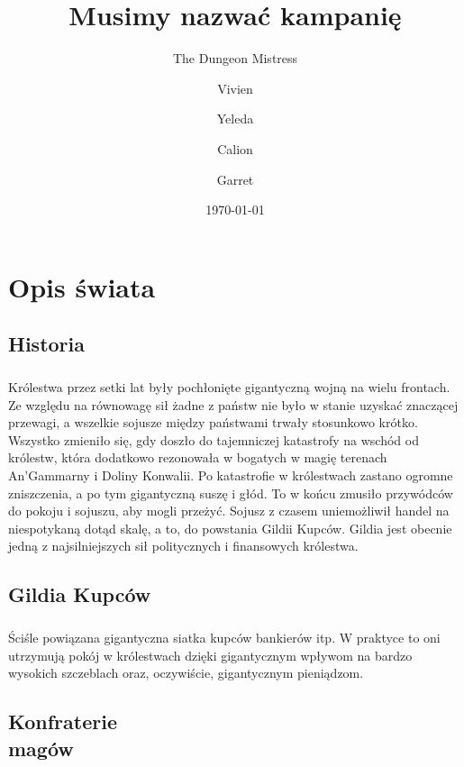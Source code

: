 \documentclass[10pt,twoside,twocolumn]{book}
\title{Musimy nazwać kampanię}
\date{\today}
\author{The Dungeon Mistress}
\author{Vivien}
\author{Yeleda}
\author{Calion}
\author{Garret}
\begin{document}
\selectfont %
\frontmatter

\maketitle
\begin{multicols}{2}
\tableofcontents
\end{multicols}

\mainmatter

\chapter{Opis świata}

\section{Historia}

\paragraph{}
Królestwa przez setki lat były pochłonięte gigantyczną wojną na wielu frontach.
Ze względu na równowagę sił żadne z państw nie było w stanie uzyskać znaczącej przewagi, a wszelkie sojusze między państwami trwały stosunkowo krótko.
Wszystko zmieniło się, gdy doszło do tajemniczej katastrofy na wschód od królestw, która dodatkowo rezonowała w bogatych w magię terenach An'Gammarny i Doliny Konwalii.
Po katastrofie w królestwach zastano ogromne zniszczenia, a po tym gigantyczną suszę i głód.
To w końcu zmusiło przywódców do pokoju i sojuszu, aby mogli przeżyć.
Sojusz z czasem uniemożliwił handel na niespotykaną dotąd skalę, a to, do powstania Gildii Kupców.
Gildia jest obecnie jedną z najsilniejszych sił politycznych i finansowych królestwa.

\section{Gildia Kupców}
\paragraph{}
Ściśle powiązana gigantyczna siatka kupców bankierów itp.
W praktyce to oni utrzymują pokój w królestwach dzięki gigantycznym wpływom na bardzo wysokich szczeblach oraz, oczywiście, gigantycznym pieniądzom.

\section{Konfraterie\\magów}
\end{document}
